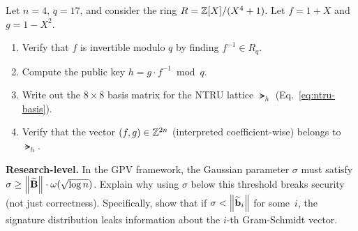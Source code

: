 \begin{prob}
\label{prob:ch08-ntru-basis}
Let $n = 4$, $q = 17$, and consider the ring $R = \mathbb{Z}[X]/(X^4+1)$.  Let $f = 1 + X$ and $g = 1 - X^2$.
\begin{enumerate}
\item[(a)] Verify that $f$ is invertible modulo $q$ by finding $f^{-1} \in R_q$.
\item[(b)] Compute the public key $h = g \cdot f^{-1} \bmod q$.
\item[(c)] Write out the $8 \times 8$ basis matrix for the NTRU lattice $\lat_h$ (Eq.~\eqref{eq:ntru-basis}).
\item[(d)] Verify that the vector $(f, g) \in \mathbb{Z}^{2n}$ (interpreted coefficient-wise) belongs to $\lat_h$.
\end{enumerate}
\end{prob}

\begin{prob}
\label{prob:ch08-gpv-sigma}
\textbf{Research-level.}  In the GPV framework, the Gaussian parameter $\sigma$ must satisfy $\sigma \geq \left\lVert \widetilde{\mathbf{B}} \right\rVert \cdot \omega(\sqrt{\log n})$.  Explain why using $\sigma$ below this threshold breaks security (not just correctness).  Specifically, show that if $\sigma < \left\lVert \widetilde{\mathbf{b}}_i \right\rVert$ for some~$i$, the signature distribution leaks information about the $i$-th Gram-Schmidt vector.
\end{prob}
